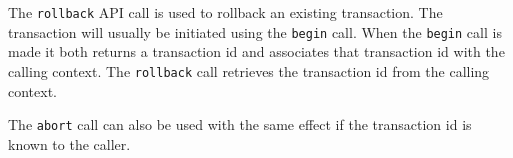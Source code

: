 The \verb+rollback+ API call is used to rollback an existing transaction. The transaction will usually
be initiated using the \verb+begin+ call. When the \verb+begin+ call is made it both returns a transaction id and
associates that transaction id with the calling context. The \verb+rollback+ call retrieves the transaction id from the calling context.

The \verb+abort+ call can also be used with the same effect if the transaction id is known to the caller.
